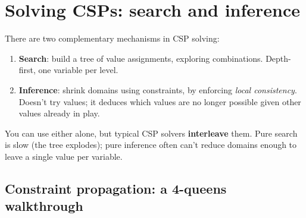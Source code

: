 \documentclass[11pt, a4paper]{article}
\begin{document}
\section{Solving CSPs: search and inference}

There are two complementary mechanisms in CSP solving:

\begin{enumerate}
  \item \textbf{Search}: build a tree of value assignments, exploring combinations. Depth-first, one variable per level.
  \item \textbf{Inference}: shrink domains using constraints, by enforcing \emph{local consistency}. Doesn't try values; it deduces which values are no longer possible given other values already in play.
\end{enumerate}

You can use either alone, but typical CSP solvers \textbf{interleave} them. Pure search is slow (the tree explodes); pure inference often can't reduce domains enough to leave a single value per variable.

\subsection{Constraint propagation: a 4-queens walkthrough}
\end{document}
